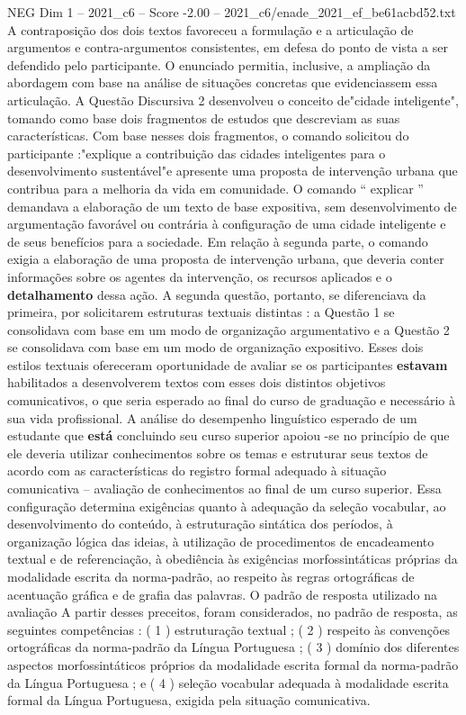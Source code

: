 \begin{textsample}{NEG Dim 1 – 2021\_c6 – Score -2.00 – 2021\_c6/enade\_2021\_ef\_be61acbd52.txt}
A contraposição dos dois textos favoreceu a formulação e a articulação de argumentos e contra-argumentos consistentes, em defesa do ponto de vista a ser defendido pelo participante.
O enunciado permitia, inclusive, a ampliação da abordagem com base na análise de situações concretas que evidenciassem essa articulação.
A Questão Discursiva 2 desenvolveu o conceito de"cidade inteligente", tomando como base dois fragmentos de estudos que descreviam as suas características.
Com base nesses dois fragmentos, o comando solicitou do participante :"explique a contribuição das cidades inteligentes para o desenvolvimento sustentável"e apresente uma proposta de intervenção urbana que contribua para a melhoria da vida em comunidade.
O comando “ explicar ” demandava a elaboração de um texto de base expositiva, sem desenvolvimento de argumentação favorável ou contrária à configuração de uma cidade inteligente e de seus benefícios para a sociedade.
Em relação à segunda parte, o comando exigia a elaboração de uma proposta de intervenção urbana, que deveria conter informações sobre os agentes da intervenção, os recursos aplicados e o \textbf{detalhamento} dessa ação.
A segunda questão, portanto, se diferenciava da primeira, por solicitarem estruturas textuais distintas : a Questão 1 se consolidava com base em um modo de organização argumentativo e a Questão 2 se consolidava com base em um modo de organização expositivo.
Esses dois estilos textuais ofereceram oportunidade de avaliar se os participantes \textbf{estavam} habilitados a desenvolverem textos com esses dois distintos objetivos comunicativos, o que seria esperado ao final do curso de graduação e necessário à sua vida profissional.
A análise do desempenho linguístico esperado de um estudante que \textbf{está} concluindo seu curso superior apoiou -se no princípio de que ele deveria utilizar conhecimentos sobre os temas e estruturar seus textos de acordo com as características do registro formal adequado à situação comunicativa – avaliação de conhecimentos ao final de um curso superior.
Essa configuração determina exigências quanto à adequação da seleção vocabular, ao desenvolvimento do conteúdo, à estruturação sintática dos períodos, à organização lógica das ideias, à utilização de procedimentos de encadeamento textual e de referenciação, à obediência às exigências morfossintáticas próprias da modalidade escrita da norma-padrão, ao respeito às regras ortográficas de acentuação gráfica e de grafia das palavras.
O padrão de resposta utilizado na avaliação A partir desses preceitos, foram considerados, no padrão de resposta, as seguintes competências : ( 1 ) estruturação textual ; ( 2 ) respeito às convenções ortográficas da norma-padrão da Língua Portuguesa ; ( 3 ) domínio dos diferentes aspectos morfossintáticos próprios da modalidade escrita formal da norma-padrão da Língua Portuguesa ; e ( 4 ) seleção vocabular adequada à modalidade escrita formal da Língua Portuguesa, exigida pela situação comunicativa.

\end{textsample}
